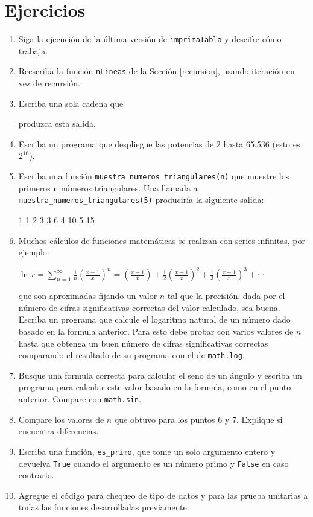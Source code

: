\section{Ejercicios}
\begin{enumerate}
\item Siga la ejecución de la última versión de \texttt{imprimaTabla} y
descifre cómo trabaja. 
\item Reescriba la función \texttt{nLineas} de la Sección \ref{recursion},
usando iteración en vez de recursión. 
\item Escriba una sola cadena que

\beforeverb 
\begin{pythoncode}
produzca
        esta
                salida.
\end{pythoncode}
\afterverb
\item Escriba un programa que despliegue las potencias de 2 hasta 65,536
(esto es $2^{16}$).
\item Escriba una función \verb+muestra_numeros_triangulares(n)+ que muestre
los primeros n números triangulares. Una llamada a \verb+muestra_numeros_triangulares(5)+
produciría la siguiente salida: \beforeverb 

\begin{pythoncode}
  1       1
  2       3
  3       6
  4       10
  5       15
  
\end{pythoncode}
\afterverb
\item Muchos cálculos de funciones matemáticas se realizan con series infinitas,
por ejemplo:

$\ln{x}=\sum_{n=1}^{\infty}\frac{1}{{n}}\left(\frac{x-1}{x}\right)^{n}=\left(\frac{x-1}{x}\right)+\frac{1}{2}\left(\frac{x-1}{x}\right)^{2}+\frac{1}{3}\left(\frac{x-1}{x}\right)^{3}+\cdots$

que son aproximadas fijando un valor $n$ tal que la precisión, dada
por el número de cifras significativas correctas del valor calculado,
sea buena. Escriba un programa que calcule el logaritmo natural de
un número dado basado en la formula anterior. Para esto debe probar
con varios valores de $n$ hasta que obtenga un buen número de cifras
significativas correctas comparando el resultado de su programa con
el de \verb+math.log+.
\item Busque una formula correcta para calcular el seno de un ángulo y escriba
un programa para calcular este valor basado en la formula, como en
el punto anterior. Compare con \verb+math.sin+.
\item Compare los valores de $n$ que obtuvo para los puntos 6 y 7. Explique
si encuentra diferencias.
\item Escriba una función, \verb+es_primo+, que tome un solo argumento
entero y devuelva \verb+True+ cuando el argumento es un número primo
y \verb+False+ en caso contrario.
\item Agregue el código para chequeo de tipo de datos y para las prueba
unitarias a todas las funciones desarrolladas previamente.
\end{enumerate}